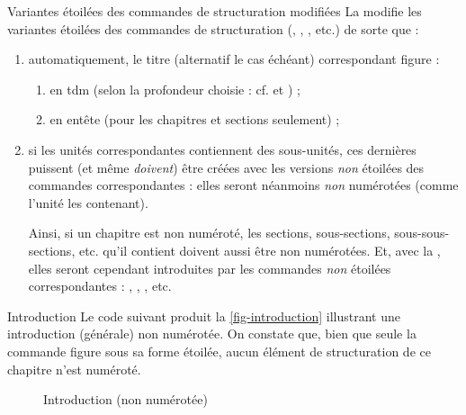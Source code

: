 \begin{dbremark}{Variantes étoilées des commandes de structuration modifiées}{}
  La \yatCl{} modifie les variantes étoilées des commandes de structuration
  (, ,
  , etc.) de sorte que :
  \begin{enumerate}
  \item automatiquement, le titre (alternatif le cas échéant) correspondant
    figure :
    \begin{enumerate}
    \item en \gls{tdm} (selon la profondeur choisie : cf.  et
      ) ;
    \item en entête (pour les chapitres et sections seulement) ;
    \end{enumerate}
  \item si les unités correspondantes contiennent des sous-unités, ces dernières
    puissent (et même \emph{doivent}) être créées avec les versions \emph{non}
    étoilées des commandes correspondantes : elles seront néanmoins \emph{non}
    numérotées (comme l'unité les contenant).

    Ainsi, si un chapitre est non numéroté, les sections, sous-sections,
    sous-sous-sections, etc. qu'il contient doivent aussi être non
    numérotées. Et, avec la \yatCl{}, elles seront cependant introduites par les
    commandes \emph{non} étoilées correspondantes : ,
    , , etc.
  \end{enumerate}
\end{dbremark}

\begin{dbexample}{Introduction}{}
  Le code suivant produit la \vref{fig-introduction} illustrant une
  introduction (générale) non numérotée. On constate que, bien que seule la
  commande  figure sous sa forme étoilée, aucun élément
  de structuration de ce chapitre n'est numéroté.
\end{dbexample}

\begin{figure}[p]
  \centering
  \caption{Introduction (non numérotée)}
  \label{fig-introduction}
\end{figure}

